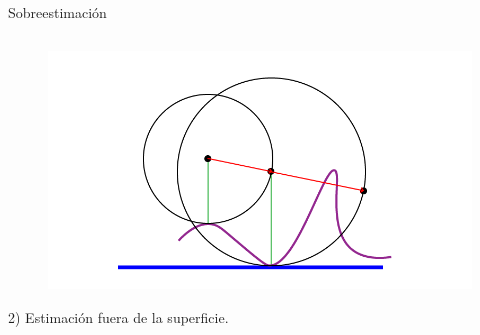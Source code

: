 \begin{frame}{Sobreestimación}
\begin{columns}[onlytextwidth]
        \begin{column}{0.45\textwidth}
            \begin{figure}[H]
              \centering
              \includegraphics[width=1.0\textwidth]{imagenes/estimation/sobreestimar-exterior.png}
            \end{figure}
            {\small 2) Estimación fuera de la superficie.}
        \end{column}
        
    \end{columns}

\end{frame}


